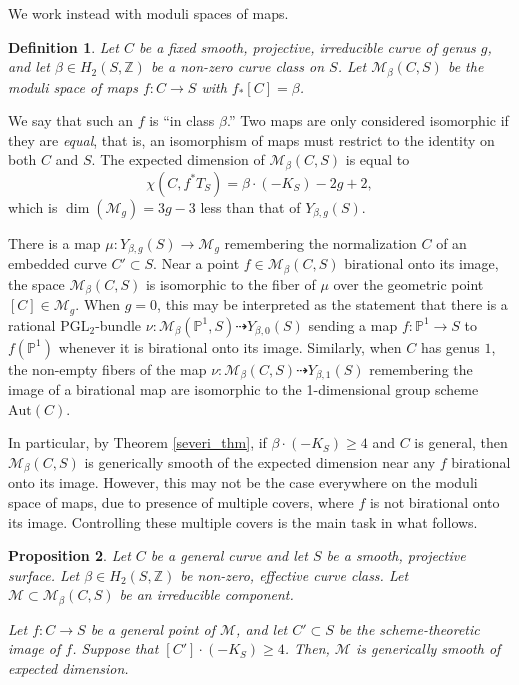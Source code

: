 \documentclass[12pt]{amsart}
\def\cM{{\mathcal{M}}}
\def\Z{\mathbb{Z}}
\def\P{\mathbb{P}}
\newtheorem{definition}{Definition}[section]
\newtheorem{proposition}[definition]{Proposition}
\begin{document}
We work instead with moduli spaces of maps.

\begin{definition}
    Let $C$ be a fixed smooth, projective, irreducible curve of genus $g$, and let $\beta\in H_2(S,\Z)$ be a non-zero curve class on $S$. Let $\cM_\beta(C,S)$ be the moduli space of maps $f:C\to S$ with $f_{*}[C]=\beta$.
\end{definition}

We say that such an $f$ is ``in class $\beta$.'' Two maps are only considered isomorphic if they are \emph{equal}, that is, an isomorphism of maps must restrict to the identity on both $C$ and $S$. The expected dimension of $\cM_\beta(C,S)$ is equal to
\begin{equation*}
    \chi(C,f^{*}T_S)=\beta\cdot (-K_S)-2g+2,
\end{equation*}
which is $\dim(\cM_g)=3g-3$ less than that of $Y_{\beta,g}(S)$.

There is a map $\mu:Y_{\beta,g}(S)\to \cM_g$ remembering the normalization $C$ of an embedded curve $C'\subset S$. Near a point $f\in \cM_\beta(C,S)$ birational onto its image, the space $\cM_\beta(C,S)$ is isomorphic to the fiber of $\mu$ over the geometric point $[C]\in \cM_g$. When $g=0$, this may be interpreted as the statement that there is a rational $\text{PGL}_2$-bundle $\nu:\cM_\beta(\P^1,S) \dashrightarrow Y_{\beta,0}(S)$ sending a map $f:\P^1\to S$ to $f(\P^1)$ whenever it is birational onto its image. Similarly, when $C$ has genus $1$, the non-empty fibers of the map $\nu:\cM_\beta(C,S) \dashrightarrow Y_{\beta,1}(S)$ remembering the image of a birational map are isomorphic to the 1-dimensional group scheme $\text{Aut}(C)$. 

 In particular, by Theorem \ref{severi_thm}, if $\beta\cdot (-K_S)\ge 4$ and $C$ is general, then $\cM_\beta(C,S)$ is generically smooth of the expected dimension near any $f$ birational onto its image. However, this may not be the case everywhere on the moduli space of maps, due to presence of multiple covers, where $f$ is not birational onto its image. Controlling these multiple covers is the main task in what follows.

 \begin{proposition}\label{prop:multiple covers}
 Let $C$ be a general curve and let $S$ be a smooth, projective surface. Let $\beta\in H_2(S,\mathbb{Z})$ be non-zero, effective curve class. Let $\cM\subset \cM_\beta(C,S)$ be an irreducible component.

 Let $f:C\to S$ be a general point of $\cM$, and let $C'\subset S$ be the scheme-theoretic image of $f$. Suppose that $[C']\cdot (-K_S) \ge 4$. Then, $\cM$ is generically smooth of expected dimension.
 \end{proposition}
\end{document}
